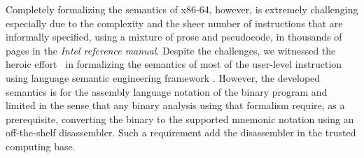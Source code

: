 \documentclass[a4paper,UKenglish,cleveref, autoref]{lipics-v2019}
\begin{document}
Completely formalizing the semantics of x86-64, however, is extremely challenging especially due to the complexity and the sheer number of instructions that are informally specified, using a mixture of prose and pseudocode, in thousands of pages in the \emph{Intel reference manual}. 
Despite the challenges, we witnessed the heroic effort~\cite{Dasgupta:2019} in formalizing the semantics of most of the user-level instruction using language semantic engineering framework \K. However, the developed semantics is for the assembly language notation of the binary program and limited in the sense that any binary analysis using that formalism require, as a prerequisite, converting the binary to the supported mnemonic notation using an off-the-shelf disassembler. Such a requirement add the disassembler in the trusted computing base.  





\end{document}
